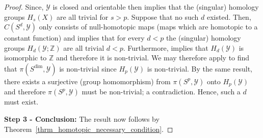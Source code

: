 \documentclass[anon,12pt]{colt2021} %
\newcommand{\yyy}{\mathcal{Y}}
\newcommand{\zz}{{\mathbb{Z}}}
\begin{document}
\begin{proof}
Since, $\yyy$ is closed and orientable then \citep[Theorem 3.30 (c)]{HatcherAlgebraicTopology} implies that the (singular) homology groups $H_s(X)$ are all trivial for $s>p$.  
%
Suppose that no such $d$ existed.  Then, $C(S^d,\yyy)$ only consists of null-homotopic maps (maps which are homotopic to a constant function) and \citep[Proposition 7.2]{spanier1994algebraic} implies that for every $d< p$ the (singular) homology groups $H_d(\yyy;\zz)$ are all trivial $d<p$.  
%
Furthermore, \citep[Theorem 3.26]{HatcherAlgebraicTopology} implies that $H_d(\yyy)$ is isomorphic to $\zz$ and therefore it is non-trivial.  We may therefore apply \citep[Hurewicz's Isomorphism Theorem; Proposition 7.2]{spanier1994algebraic} to find that $\pi(S^{\dim},\yyy)$ is non-trivial since $H_{p}(\yyy)$ is non-trivial.  By the same result, there exists a surjective (group homomorphism) from $\pi(S^{p},\yyy)$ onto $H_{p}(\yyy)$ and therefore $\pi(S^{p},\yyy)$ must be non-trivial; a contradiction.  Hence, such a $d$ must exist.  

\textbf{Step 3 - Conclusion: }
The result now follows by Theorem~\ref{thrm_homotopic_necessary_condition}.  
\end{proof}
\end{document}
